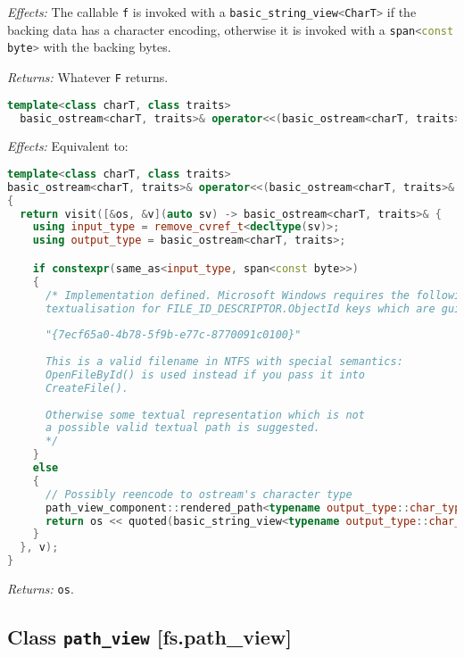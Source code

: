 \documentclass[11pt]{article}
\newcommand{\code}[2][cpp]{\lstinline[language=#1,basicstyle=\small\ttfamily]{#2}}
\newcommand{\desc}[1]{\textit{#1}}
\newcommand{\effects}{\desc{Effects: }}
\newcommand{\returns}{\desc{Returns: }}
\begin{document}
\effects The callable \code{f} is invoked with a \code{basic_string_view<CharT>} if the backing data has a character encoding, otherwise it is invoked with a \code{span<const byte>} with the backing bytes.

\returns Whatever \code{F} returns.\\

\begin{lstlisting}[language=cpp]
  template<class charT, class traits>
  basic_ostream<charT, traits>& operator<<(basic_ostream<charT, traits>& os, path_view_component v);
\end{lstlisting}

\effects Equivalent to:\begin{lstlisting}[language=cpp]
template<class charT, class traits>
basic_ostream<charT, traits>& operator<<(basic_ostream<charT, traits>& os, path_view_component v)
{
  return visit([&os, &v](auto sv) -> basic_ostream<charT, traits>& {
    using input_type = remove_cvref_t<decltype(sv)>;
    using output_type = basic_ostream<charT, traits>;

    if constexpr(same_as<input_type, span<const byte>>)
    {
      /* Implementation defined. Microsoft Windows requires the following
      textualisation for FILE_ID_DESCRIPTOR.ObjectId keys which are guids:
      
      "{7ecf65a0-4b78-5f9b-e77c-8770091c0100}"
      
      This is a valid filename in NTFS with special semantics:
      OpenFileById() is used instead if you pass it into
      CreateFile().
      
      Otherwise some textual representation which is not
      a possible valid textual path is suggested.
      */
    }
    else
    {
      // Possibly reencode to ostream's character type
      path_view_component::rendered_path<typename output_type::char_type> zbuff(v, path_view_component::not_zero_terminated);
      return os << quoted(basic_string_view<typename output_type::char_type>(zbuff.buffer, zbuff.length));
    }
  }, v);
}
\end{lstlisting}

\returns \code{os}.\\

\subsection*{Class \code{path_view} [fs.path\_view]}
\end{document}
